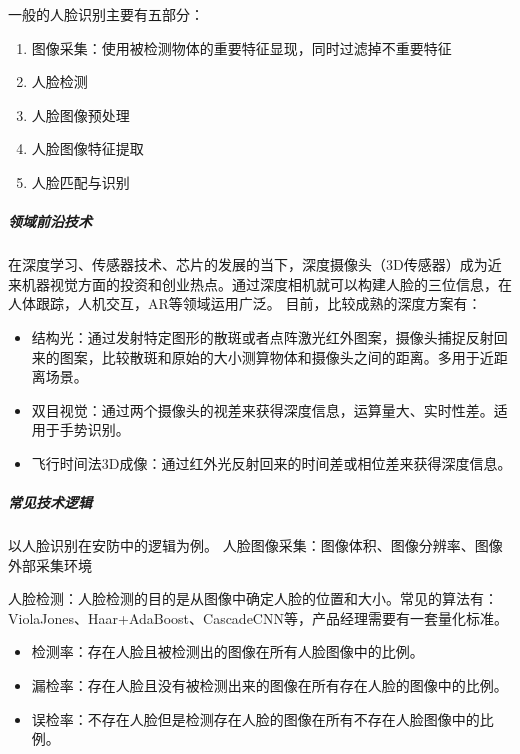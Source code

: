 \documentclass[letterpaper,11pt,english]{sphinxmanual}
\begin{document}
一般的人脸识别主要有五部分：
\begin{enumerate}
%
\item {} 
图像采集：使用被检测物体的重要特征显现，同时过滤掉不重要特征

\item {} 
人脸检测

\item {} 
人脸图像预处理

\item {} 
人脸图像特征提取

\item {} 
人脸匹配与识别

\end{enumerate}


\subparagraph{领域前沿技术}
\label{\detokenize{chapter_idea/understand_tech:id35}}
在深度学习、传感器技术、芯片的发展的当下，深度摄像头（3D传感器）成为近来机器视觉方面的投资和创业热点。通过深度相机就可以构建人脸的三位信息，在人体跟踪，人机交互，AR等领域运用广泛。
目前，比较成熟的深度方案有：
\begin{itemize}
\item {} 
结构光：通过发射特定图形的散斑或者点阵激光红外图案，摄像头捕捉反射回来的图案，比较散斑和原始的大小测算物体和摄像头之间的距离。多用于近距离场景。

\item {} 
双目视觉：通过两个摄像头的视差来获得深度信息，运算量大、实时性差。适用于手势识别。

\item {} 
飞行时间法3D成像：通过红外光反射回来的时间差或相位差来获得深度信息。

\end{itemize}


\subparagraph{常见技术逻辑}
\label{\detokenize{chapter_idea/understand_tech:id36}}
以人脸识别在安防中的逻辑为例。
人脸图像采集：图像体积、图像分辨率、图像外部采集环境

人脸检测：人脸检测的目的是从图像中确定人脸的位置和大小。常见的算法有：Viola\sphinxhyphen{}Jones、Haar+AdaBoost、CascadeCNN等，产品经理需要有一套量化标准。
\begin{itemize}
\item {} 
检测率：存在人脸且被检测出的图像在所有人脸图像中的比例。

\item {} 
漏检率：存在人脸且没有被检测出来的图像在所有存在人脸的图像中的比例。

\item {} 
误检率：不存在人脸但是检测存在人脸的图像在所有不存在人脸图像中的比例。

\end{itemize}
\end{document}
